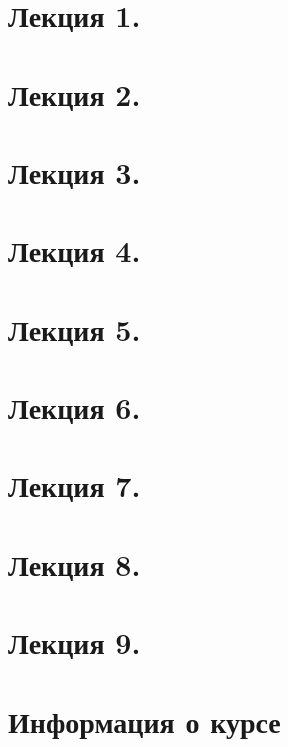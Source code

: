 \newpage
\section{Лекция 1.}


\newpage
\section{Лекция 2.}


\newpage
\section{Лекция 3.}


\newpage
\section{Лекция 4.}


\newpage
\section{Лекция 5.}


\newpage
\section{Лекция 6.}


\newpage
\section{Лекция 7.}


\newpage
\section{Лекция 8.}


\newpage
\section{Лекция 9.}




\newpage
\section{Информация о курсе}
